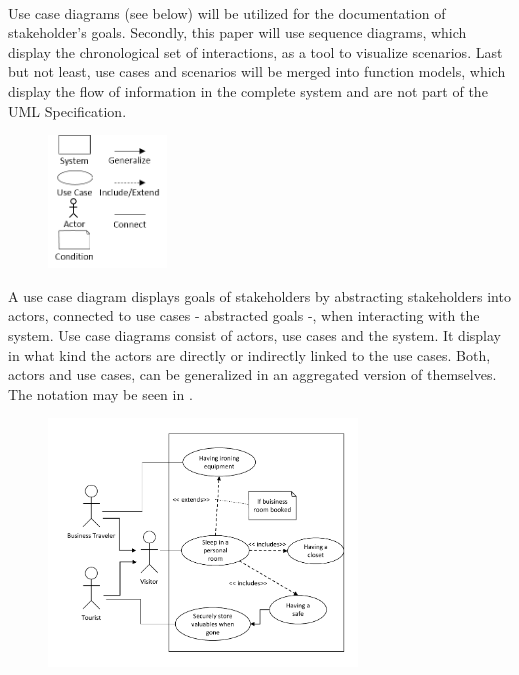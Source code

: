 \paragraph{}
Use case diagrams (see below) will be utilized for the documentation of stakeholder's goals. Secondly, this paper will use sequence diagrams, which display the chronological set of interactions, as a tool to visualize scenarios. Last but not least, use cases and scenarios will be merged into function models, which display the flow of information in the complete system and are not part of the UML Specification. 

\begin{figure}[H] 
    \centering
    \includegraphics[width=0.28\textwidth]{img/ucSymb.png}
    \label{fig:ucSymb}
\end{figure}

A use case diagram displays goals of stakeholders by abstracting stakeholders into actors, connected to use cases - abstracted goals -, when interacting with the system. Use case diagrams consist of actors, use cases and the system. It display in what kind the actors are directly or indirectly linked to the use cases. Both, actors and use cases, can be generalized in an aggregated version of themselves. The notation may be seen in .

\begin{figure}[H]
    \centering
    \includegraphics[width=0.73\textwidth]{img/ucEx.pdf}
    \label{fig:ucEx}
\end{figure}

